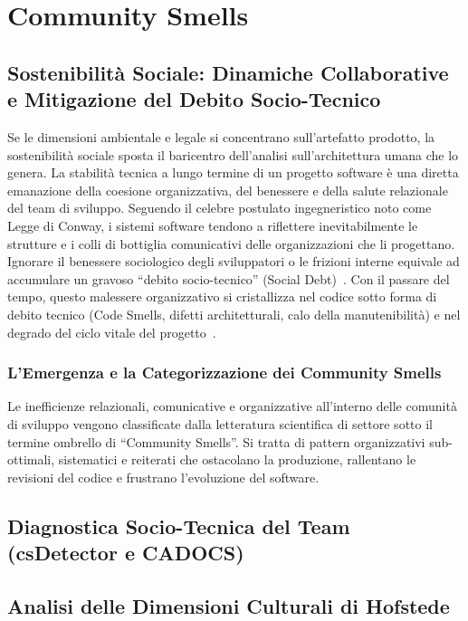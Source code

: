 \chapter{Community Smells}

\section{Sostenibilità Sociale: Dinamiche Collaborative e Mitigazione del Debito Socio-Tecnico}

Se le dimensioni ambientale e legale si concentrano sull'artefatto prodotto, la sostenibilità sociale sposta il baricentro dell'analisi sull'architettura umana che lo genera. La stabilità tecnica a lungo termine di un progetto software è una diretta emanazione della coesione organizzativa, del benessere e della salute relazionale del team di sviluppo. Seguendo il celebre postulato ingegneristico noto come Legge di Conway, i sistemi software tendono a riflettere inevitabilmente le strutture e i colli di bottiglia comunicativi delle organizzazioni che li progettano. Ignorare il benessere sociologico degli sviluppatori o le frizioni interne equivale ad accumulare un gravoso ``debito socio-tecnico'' (Social Debt)~\cite{30}. Con il passare del tempo, questo malessere organizzativo si cristallizza nel codice sotto forma di debito tecnico (Code Smells, difetti architetturali, calo della manutenibilità) e nel degrado del ciclo vitale del progetto~\cite{31}.

\subsection{L'Emergenza e la Categorizzazione dei Community Smells}

Le inefficienze relazionali, comunicative e organizzative all'interno delle comunità di sviluppo vengono classificate dalla letteratura scientifica di settore sotto il termine ombrello di ``Community Smells''. Si tratta di pattern organizzativi sub-ottimali, sistematici e reiterati che ostacolano la produzione, rallentano le revisioni del codice e frustrano l'evoluzione del software.

\section{Diagnostica Socio-Tecnica del Team (csDetector e CADOCS)}

\section{Analisi delle Dimensioni Culturali di Hofstede}
